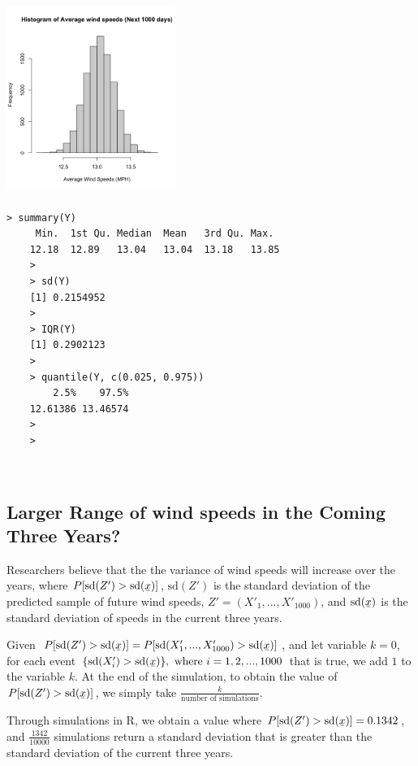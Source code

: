 \documentclass[11pt]{article}
\newcommand\barbelow[1]{\stackunder[1.2pt]{$#1$}{\rule{.8ex}{.075ex}}}
\begin{document}
\begin{minipage}{0.4\textwidth}
    \centering
    \includegraphics[width = 5.5cm, height = 6.3cm]{YHist.png}
    \label{fig:histy}
\end{minipage}%
\begin{minipage}{0.6\textwidth}
    \centering
    \begin{lstlisting}[caption={Summary Statistics of $Y'$},
                        label={list:summaryy},
                        captionpos=b]
    > summary(Y)
     Min.  1st Qu. Median  Mean   3rd Qu. Max. 
    12.18  12.89   13.04   13.04  13.18   13.85 
    >
    > sd(Y)
    [1] 0.2154952
    >
    > IQR(Y)
    [1] 0.2902123
    >
    > quantile(Y, c(0.025, 0.975))
        2.5%    97.5% 
    12.61386 13.46574
    >
    >
    \end{lstlisting}
\end{minipage}\\

\subsection{Larger Range of wind speeds in the Coming Three Years?}
Researchers believe that the the variance of wind speeds will increase over the years, where $P[\text{sd}(Z')>\text{sd}(\barbelow{x})]$, $\text{sd}(Z')$ is the standard deviation of the predicted sample of future wind speeds, $Z' = (X'_{1},...,X'_{1000})$, and $\text{sd}(\barbelow{x})$ is the standard deviation of speeds in the current three years. \\
\par Given $P[\text{sd}(Z')>\text{sd}(\barbelow{x})] =P[\text{sd}(X'_{1},...,X'_{1000})>\text{sd}(\barbelow{x})]$, and let variable $k=0$, for each event $\{\text{sd}(X'_{i})>\text{sd}(\barbelow{x})\},\text{ where }i = 1,2,...,1000$ that is true, we add $1$ to the variable $k$. At the end of the simulation, to obtain the value of $P[\text{sd}(Z')>\text{sd}(\barbelow{x})]$, we simply take $\frac{k}{\text{number of simulations}}$.\\
\par Through simulations in R, we obtain a value where $P[\text{sd}(Z')>\text{sd}(\barbelow{x})]=0.1342$, and $\frac{1342}{10000}$ simulations return a standard deviation that is greater than the standard deviation of the current three years.
\end{document}
